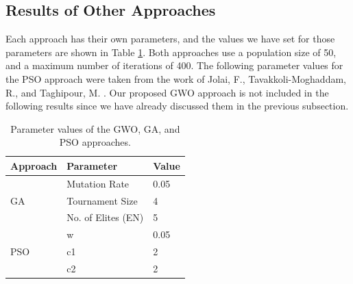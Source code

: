 \subsection{Results of Other Approaches}
Each approach has their own parameters, and the values we have set for those parameters are shown in Table \ref{approach-parameters}. Both approaches use a population size of 50, and a maximum number of iterations of 400. The following parameter values for the PSO approach were taken from the work of Jolai, F., Tavakkoli-Moghaddam, R., and Taghipour, M. \cite{Jolai2012}. Our proposed GWO approach is not included in the following results since we have already discussed them in the previous subsection.

\begin{table}[h!]
	\centering
	\begin{tabular}{|l|l|l|}
		\hline
		\textbf{Approach}   & \textbf{Parameter} & \textbf{Value} \\ \hline
		\multirow{3}{*}{GA} & Mutation Rate      & 0.05           \\ \cline{2-3} 
		& Tournament Size    & 4              \\ \cline{2-3} 
		& No. of Elites (EN) & 5              \\ \hline
		\multirow{3}{*}{PSO} & w      & 0.05           \\ \cline{2-3} 
		& c1    & 2              \\ \cline{2-3} 
		& c2 	& 2              \\ \hline
	\end{tabular}
	\caption{Parameter values of the GWO, GA, and PSO approaches.}
	\label{approach-parameters}
\end{table}

